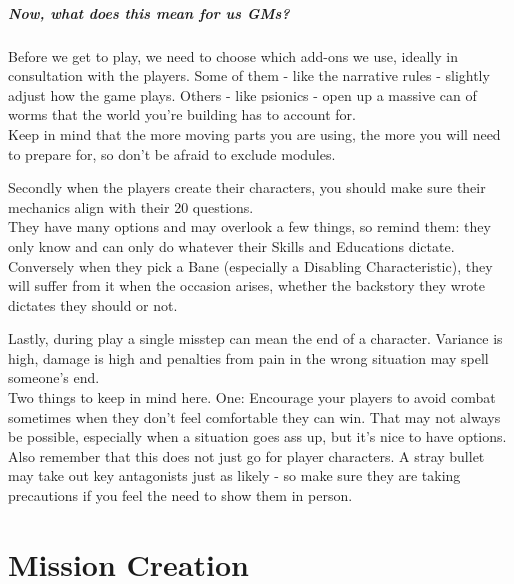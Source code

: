 \documentclass[12pt,a4paper,openany]{book}
\begin{document}
	\paragraph{Now, what does this mean for us GMs?}
	\def\hspacepar{5mm}
	\def\vspacepar{-5mm}
	Before we get to play, we need to choose which add-ons we use, ideally in consultation with the players. Some of them - like the narrative rules - slightly adjust how the game plays. Others - like psionics - open up a massive can of worms that the world you're building has to account for.\\
	\hspace*{\hspacepar} Keep in mind that the more moving parts you are using, the more you will need to prepare for, so don't be afraid to exclude modules.\par \vspace{\vspacepar}
	Secondly when the players create their characters, you should make sure their mechanics align with their 20 questions.\\
	\hspace*{\hspacepar} They have many options and may overlook a few things, so remind them: they only know and can only do whatever their Skills and Educations dictate. Conversely when they pick a Bane (especially a Disabling Characteristic), they will suffer from it when the occasion arises, whether the backstory they wrote dictates they should or not.\par \vspace{\vspacepar}
	Lastly, during play a single misstep can mean the end of a character. Variance is high, damage is high and penalties from pain in the wrong situation may spell someone's end.\\
	\hspace*{\hspacepar} Two things to keep in mind here. One: Encourage your players to avoid combat sometimes when they don't feel comfortable they can win. That may not always be possible, especially when a situation goes ass up, but it's nice to have options.\\
	\hspace*{\hspacepar} Also remember that this does not just go for player characters. A stray bullet may take out key antagonists just as likely - so make sure they are taking precautions if you feel the need to show them in person.

	\chapter{Mission Creation}
	
\end{document}
